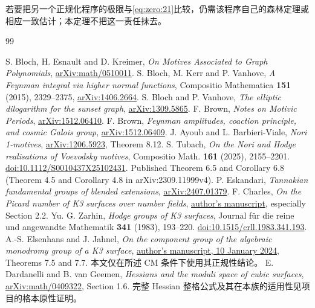 \documentclass[11pt,a4paper,oneside]{ctexart}
\theoremstyle{cnplain}
\theoremstyle{definition}
\theoremstyle{remark}
\numberwithin{equation}{section}
\begin{document}
若要把另一个正规化程序的极限与\eqref{eq:zero:21}比较，仍需该程序自己的森林定理或相应一致估计；本定理不把这一责任抹去。


\endgroup

\begin{thebibliography}{99}
 S. Bloch, H. Esnault and D. Kreimer, \emph{On Motives Associated to Graph Polynomials}, \href{https://arxiv.org/abs/math/0510011}{arXiv:math/0510011}.
 S. Bloch, M. Kerr and P. Vanhove, \emph{A Feynman integral via higher normal functions}, Compositio Mathematica \textbf{151} (2015), 2329--2375, \href{https://arxiv.org/abs/1406.2664}{arXiv:1406.2664}.
 S. Bloch and P. Vanhove, \emph{The elliptic dilogarithm for the sunset graph}, \href{https://arxiv.org/abs/1309.5865}{arXiv:1309.5865}.
 F. Brown, \emph{Notes on Motivic Periods}, \href{https://arxiv.org/abs/1512.06410}{arXiv:1512.06410}.
 F. Brown, \emph{Feynman amplitudes, coaction principle, and cosmic Galois group}, \href{https://arxiv.org/abs/1512.06409}{arXiv:1512.06409}.
 J. Ayoub and L. Barbieri-Viale, \emph{Nori 1-motives}, \href{https://arxiv.org/abs/1206.5923}{arXiv:1206.5923}, Theorem 8.12.
 S. Tubach, \emph{On the Nori and Hodge realisations of Voevodsky motives},
Compositio Math. \textbf{161} (2025), 2155--2201.
\href{https://doi.org/10.1112/S0010437X25102431}{doi:10.1112/S0010437X25102431}.
Published Theorem 6.5 and Corollary 6.8 (Theorem 4.5 and Corollary 4.8 in arXiv:2309.11999v4).
 P. Eskandari, \emph{Tannakian fundamental groups of blended extensions}, \href{https://arxiv.org/abs/2407.01379}{arXiv:2407.01379}.
 F. Charles, \emph{On the Picard number of K3 surfaces over number fields}, \href{https://www.imo.universite-paris-saclay.fr/~francois.charles/Picard.pdf}{author's manuscript}, especially Section 2.2.
 Yu. G. Zarhin, \emph{Hodge groups of K3 surfaces}, Journal für die reine und angewandte Mathematik \textbf{341} (1983), 193--220. \href{https://doi.org/10.1515/crll.1983.341.193}{doi:10.1515/crll.1983.341.193}.
 A.-S. Elsenhans and J. Jahnel, \emph{On the component group of the algebraic monodromy group of a K3 surface}, \href{https://wwwuser.gwdguser.de/~jjahnel/Arbeiten/Komponentengruppe_v4f.pdf}{author's manuscript, 10 January 2024}, Theorems 7.5 and 7.7. 本文仅在所述 CM 条件下使用其正规性结论。
 E. Dardanelli and B. van Geemen, \emph{Hessians and the moduli space of cubic surfaces}, \href{https://arxiv.org/abs/math/0409322}{arXiv:math/0409322}, Section 1.6. 完整 Hessian 整格公式及其在本族的适用性见项目的格本原性证明。

\end{thebibliography}
\end{document}
